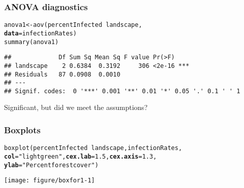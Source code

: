 \documentclass[color=usenames,dvipsnames]{beamer}\usepackage[]{graphicx}\usepackage[]{color}
\makeatletter
\newcommand{\hlnum}[1]{\textcolor[rgb]{0.69,0.494,0}{#1}}%
\newcommand{\hlstr}[1]{\textcolor[rgb]{0.749,0.012,0.012}{#1}}%
\newcommand{\hlopt}[1]{\textcolor[rgb]{0,0,0}{#1}}%
\newcommand{\hlstd}[1]{\textcolor[rgb]{0,0,0}{#1}}%
\newcommand{\hlkwb}[1]{\textcolor[rgb]{0,0.341,0.682}{#1}}%
\newcommand{\hlkwc}[1]{\textcolor[rgb]{0,0,0}{\textbf{#1}}}%
\newcommand{\hlkwd}[1]{\textcolor[rgb]{0.004,0.004,0.506}{#1}}%
\newenvironment{kframe}{%
 \def\at@end@of@kframe{}%
 \ifinner\ifhmode%
  \def\at@end@of@kframe{\end{minipage}}%
  \begin{minipage}{\columnwidth}%
 \fi\fi%
 \def\FrameCommand##1{\hskip\@totalleftmargin \hskip-\fboxsep
 \colorbox{shadecolor}{##1}\hskip-\fboxsep
     \hskip-\linewidth \hskip-\@totalleftmargin \hskip\columnwidth}%
 \MakeFramed {\advance\hsize-\width
   \@totalleftmargin\z@ \linewidth\hsize
   \@setminipage}}%
 {\par\unskip\endMakeFramed%
 \at@end@of@kframe}
\newenvironment{knitrout}{}{} %
\makeatother
\begin{document}
\begin{frame}[fragile]
  \frametitle{ANOVA diagnostics}
\begin{knitrout}\footnotesize
{}\color{fgcolor}\begin{kframe}
\begin{alltt}
\hlstd{anova1} \hlkwb{<-} \hlkwd{aov}\hlstd{(percentInfected} \hlopt{~} \hlstd{landscape,}
              \hlkwc{data}\hlstd{=infectionRates)}
\hlkwd{summary}\hlstd{(anova1)}
\end{alltt}
\begin{verbatim}
##             Df Sum Sq Mean Sq F value Pr(>F)    
## landscape    2 0.6384  0.3192     306 <2e-16 ***
## Residuals   87 0.0908  0.0010                   
## ---
## Signif. codes:  0 '***' 0.001 '**' 0.01 '*' 0.05 '.' 0.1 ' ' 1
\end{verbatim}
\end{kframe}
\end{knitrout}
\pause
\vfill
Significant, but did we meet the assumptions?
\end{frame}



\begin{frame}[fragile]
  \frametitle{Boxplots}
\begin{knitrout}\footnotesize
{}\color{fgcolor}\begin{kframe}
\begin{alltt}
\hlkwd{boxplot}\hlstd{(percentInfected}\hlopt{~}\hlstd{landscape, infectionRates,}
        \hlkwc{col}\hlstd{=}\hlstr{"lightgreen"}\hlstd{,} \hlkwc{cex.lab}\hlstd{=}\hlnum{1.5}\hlstd{,} \hlkwc{cex.axis}\hlstd{=}\hlnum{1.3}\hlstd{,}
        \hlkwc{ylab}\hlstd{=}\hlstr{"Percent forest cover"}\hlstd{)}
\end{alltt}
\end{kframe}
\end{knitrout}
\vspace{-0.5cm}
\centering
\texttt{[image: figure/boxfor1-1]} \\
\end{frame}
\end{document}
